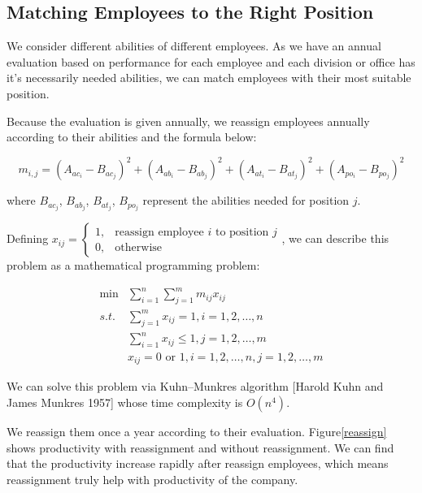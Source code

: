 \documentclass[12pt,a4paper,titlepage]{article}
\begin{document}
\subsection{Matching Employees to the Right Position}
\label{sec:matching-employees-to-the-right-position}

We consider different abilities of different employees. As we have an
annual evaluation based on performance for each employee and each
division or office has it's necessarily needed abilities, we can match
employees with their most suitable position.

Because the evaluation is given annually, we reassign employees
annually according to their abilities and the formula below:

\begin{equation}
m_{i,j} =
{(A_{ac_i}-B_{ac_j})}^2 + {(A_{ab_i}-B_{ab_j})}^2 + {(A_{at_i}-B_{at_j})}^2
+ {(A_{po_i}-B_{po_j})}^2
\end{equation}

where $B_{ac_j}$, $B_{ab_j}$, $B_{at_j}$, $B_{po_j}$ represent the
abilities needed for position $j$.

Defining $x_{ij}=\begin{cases} 1 , & \mbox{reassign employee } i
  \mbox{ to position } j \\ 0,&\mbox{otherwise} \end{cases}$, we can
describe this problem as a mathematical programming problem:

\begin{equation}
  \begin{split}
  \min&\sum_{i=1}^n\sum_{j=1}^m m_{ij}x_{ij} \\
  s.t.& \sum_{j=1}^m x_{ij}=1, i=1,2,\ldots,n \\
  &\sum_{i=1}^n x_{ij} \le1,j=1,2,\ldots,m \\
  &x_{ij}=0 \mbox{ or } 1,i=1,2,\ldots,n,j=1,2,\ldots,m
  \end{split}
\end{equation}

We can solve this problem via Kuhn–Munkres algorithm [Harold Kuhn and
James Munkres 1957] whose time complexity is $O(n^4)$.

We reassign them once a year according to their
evaluation. Figure\ref{reassign} shows productivity with reassignment
and without reassignment. We can find that the productivity increase
rapidly after reassign employees, which means reassignment truly help
with productivity of the company.
\end{document}
